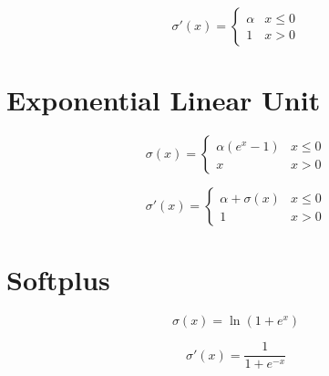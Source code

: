 \documentclass{article}
\begin{document}
\begin{equation}
  \sigma'(x) =
    \begin{cases}
      \alpha & x \leq 0\\
      1 & x > 0
    \end{cases}
\end{equation}

\clearpage

\section{Exponential Linear Unit}

\begin{equation}
  \sigma(x) =
    \begin{cases}
      \alpha(e^x - 1) & x \leq 0\\
      x & x > 0
    \end{cases}
\end{equation}

\begin{equation}
  \sigma'(x) =
    \begin{cases}
      \alpha + \sigma(x) & x \leq 0\\
      1 & x > 0
    \end{cases}
\end{equation}

\clearpage

\section{Softplus}

\begin{figure}[!htb]
  \centering
\end{figure}

\begin{equation}
  \sigma(x) = \ln(1 + e^x)
\end{equation}

\begin{equation}
  \sigma'(x) = \frac{1}{1 + e^{-x}}
\end{equation}
\end{document}
